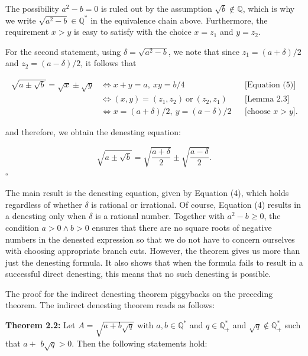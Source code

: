 \documentclass[11pt,letterpaper]{article}
\begin{document}
The possibility $a^{2}-b=0$ is ruled out by the assumption $\sqrt{b} \notin \mathbb{Q}$, which is why we write $\sqrt{a^{2}-b} \in \mathbb{Q}^{*}$ in the equivalence chain above. Furthermore, the requirement $x>y$ is easy to satisfy with the choice $x=z_{1}$ and $y=z_{2}$.

For the second statement, using $\delta=\sqrt{a^{2}-b}$, we note that since $z_{1}=(a+\delta) / 2$ and $z_{2}=(a-\delta) / 2$, it follows that

\[
\begin{aligned}
\sqrt{a\pm\sqrt b}=\sqrt x\pm\sqrt y
&\Longleftrightarrow x+y=a,\ xy=b/4 &&\text{[Equation (5)]}\\
&\Longleftrightarrow (x,y)=(z_1,z_2)\ \text{or}\ (z_2,z_1)
      &&\text{[Lemma 2.3]}\\
&\Longleftrightarrow x=(a+\delta)/2,\ y=(a-\delta)/2
      &&\text{[choose $x>y$]}.
\end{aligned}
\]

and therefore, we obtain the denesting equation:


\begin{equation*}
\sqrt{a \pm \sqrt{b}}=\sqrt{\frac{a+\delta}{2}} \pm \sqrt{\frac{a-\delta}{2}} . \tag{6}\label{eq:6}
\end{equation*}
 \(\square\)

The main result is the denesting equation, given by Equation (4), which holds regardless of whether $\delta$ is rational or irrational. Of course, Equation (4) results in a denesting only when $\delta$ is a rational number. Together with $a^2-b\geq0$, the condition $a>0\wedge b>0$ ensures that there are no square roots of negative numbers in the denested expression so that we do not have to concern ourselves with choosing appropriate branch cuts. However, the theorem gives us more than just the denesting formula. It also shows that when the formula fails to result in a successful direct denesting, this means that no such denesting is possible.

The proof for the indirect denesting theorem piggybacks on the preceding theorem. The indirect denesting theorem reads as follows:

\noindent\textbf{Theorem 2.2:} Let $A=\sqrt{a+b \sqrt{q}}$ with $a, b \in \mathbb{Q}^{*}$ and $q \in \mathbb{Q}_{+}^{*}$ and $\sqrt{q} \notin \mathbb{Q}_{+}^{*}$ such that $a+$ $b \sqrt{q}>0$. Then the following statements hold:
\end{document}
